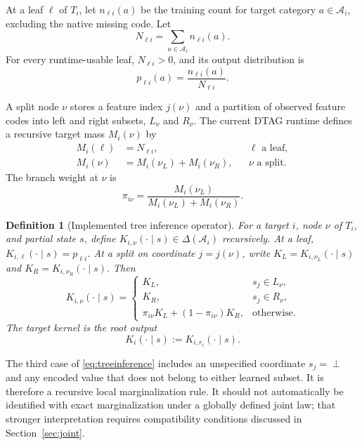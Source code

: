 \documentclass[journal]{IEEEtran}
\newtheorem{definition}{Definition}
\newcommand{\A}{\mathcal{A}}
\newcommand{\botv}{\perp}
\newcommand{\1}{\mathbf{1}}
\begin{document}
At a leaf $\ell$ of $T_i$, let $n_{\ell i}(a)$ be the training count for target category $a\in\A_i$, excluding the native missing code. Let
\begin{equation}
  N_{\ell i}=\sum_{a\in\A_i}n_{\ell i}(a).
\end{equation}
For every runtime-usable leaf, $N_{\ell i}>0$, and its output distribution is
\begin{equation}
  p_{\ell i}(a)=\frac{n_{\ell i}(a)}{N_{\ell i}}.
  \label{eq:leafdist}
\end{equation}

A split node $\nu$ stores a feature index $j(\nu)$ and a partition of observed feature codes into left and right subsets, $L_\nu$ and $R_\nu$. The current DTAG runtime defines a recursive target mass $M_i(\nu)$ by
\begin{align}
  M_i(\ell) &= N_{\ell i}, && \ell\text{ a leaf},\\
  M_i(\nu) &= M_i(\nu_L)+M_i(\nu_R), && \nu\text{ a split}.
  \label{eq:subtreemass}
\end{align}
The branch weight at $\nu$ is
\begin{equation}
  \pi_{i\nu}=\frac{M_i(\nu_L)}{M_i(\nu_L)+M_i(\nu_R)}.
  \label{eq:branchweight}
\end{equation}

\begin{definition}[Implemented tree inference operator]
For a target $i$, node $\nu$ of $T_i$, and partial state $s$, define $K_{i,\nu}(\cdot\mid s)\in\Delta(\A_i)$ recursively. At a leaf, $K_{i,\ell}(\cdot\mid s)=p_{\ell i}$. At a split on coordinate $j=j(\nu)$, write $K_L=K_{i,\nu_L}(\cdot\mid s)$ and $K_R=K_{i,\nu_R}(\cdot\mid s)$. Then
\begin{equation}
K_{i,\nu}(\cdot\mid s)=
\begin{cases}
K_L, & s_j\in L_\nu,\\
K_R, & s_j\in R_\nu,\\
\pi_{i\nu}K_L+(1-\pi_{i\nu})K_R,
  & \text{otherwise.}
\end{cases}
\label{eq:treeinference}
\end{equation}
The target kernel is the root output
\begin{equation}
  K_i(\cdot\mid s):=K_{i,r_i}(\cdot\mid s).
\end{equation}
\end{definition}

The third case of \eqref{eq:treeinference} includes an unspecified coordinate $s_j=\botv$ and any encoded value that does not belong to either learned subset. It is therefore a recursive local marginalization rule. It should not automatically be identified with exact marginalization under a globally defined joint law; that stronger interpretation requires compatibility conditions discussed in Section~\ref{sec:joint}.
\end{document}
